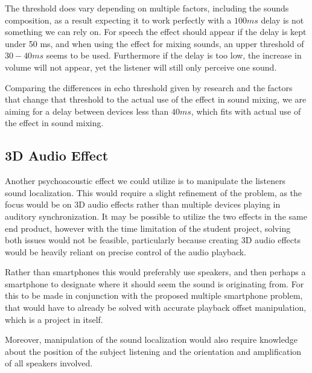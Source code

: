 The threshold does vary depending on multiple factors, including the sounds composition, as a result expecting it to work perfectly with a $100 ms$ delay is not something we can rely on.
For speech the effect should appear if the delay is kept under 50 ms, and when using the effect for mixing sounds, an upper threshold of $30 - 40 ms$ seems to be used.
Furthermore if the delay is too low, the increase in volume will not appear, yet the listener will still only perceive one sound.\cite{useprecedence1, useprecedence2, useprecedence3}

Comparing the differences in echo threshold given by research and the factors that change that threshold to the actual use of the effect in sound mixing, we are aiming for a delay between devices less than $40 ms$, which fits with actual use of the effect in sound mixing.

\subsection{3D Audio Effect}
Another psychoacoustic effect we could utilize is to manipulate the listeners sound localization.
This would require a slight refinement of the problem, as the focus would be on 3D audio effects rather than multiple devices playing in auditory synchronization.
It may be possible to utilize the two effects in the same end product, however with the time limitation of the student project, solving both issues would not be feasible, particularly because creating 3D audio effects would be heavily reliant on precise control of the audio playback.

Rather than smartphones this would preferably use speakers, and then perhaps a smartphone to designate where it should seem the sound is originating from.
For this to be made in conjunction with the proposed multiple smartphone problem, that would have to already be solved with accurate playback offset manipulation, which is a project in itself.

Moreover, manipulation of the sound localization would also require knowledge about the position of the subject listening and the orientation and amplification of all speakers involved.

